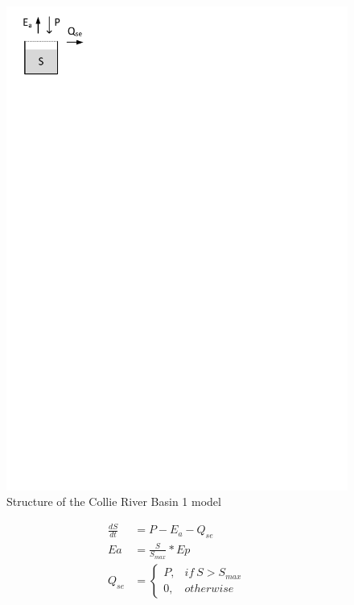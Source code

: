 { 																	%
\begin{figure}
\includegraphics[trim=1cm 25.5cm 9cm 1cm,keepaspectratio]{./files/01_schematic.pdf}
\caption{Structure of the Collie River Basin 1 model} \label{fig:01_schematic}
\end{figure}

\begin{align}
	\frac{dS}{dt} &= P -E_a-Q_{se} \\
	Ea &= \frac{S}{S_{max}}*Ep\\
	Q_{se} &= 
		\begin{cases}
			P, & if~S>S_{max}\\
			0, & otherwise
		\end{cases}
\end{align}
}
\vspace{1.5cm}

